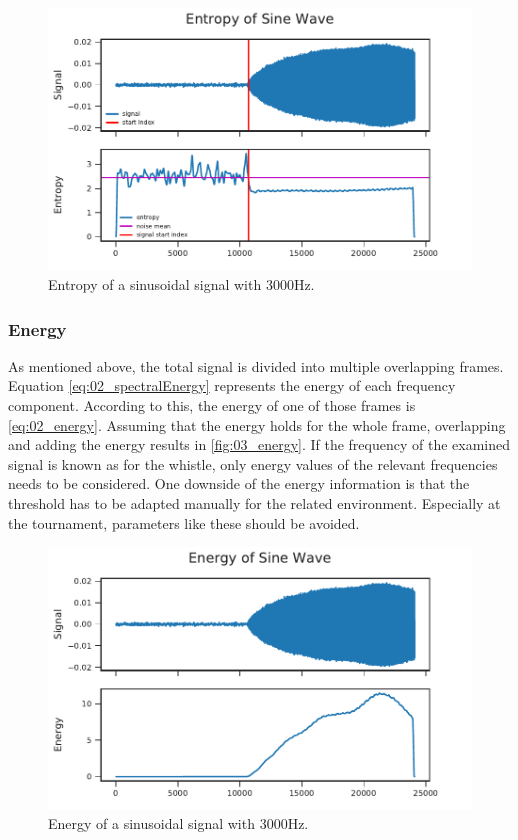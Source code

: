 \begin{figure}[ht]
	\centering
		\includegraphics[]{figures/sine_entropy}
	\caption{Entropy of a sinusoidal signal with 3000Hz.}
\end{figure}
\label{fig:03_entropy}

\subsubsection*{Energy}

As mentioned above, the total signal is divided into multiple overlapping frames.
Equation \cref{eq:02_spectralEnergy} represents the energy of each frequency
component.
According to this, the energy of one of those frames is \cref{eq:02_energy}.
Assuming that the energy holds for the whole frame, overlapping and adding the energy
results in \cref{fig:03_energy}.
If the frequency of the examined signal is known as for the whistle, only energy values
of the relevant frequencies needs to be considered.
One downside of the energy information is that the threshold has to be adapted
manually for the related environment.
Especially at the tournament, parameters like these should be avoided.

\begin{figure}[ht]
	\centering
		\includegraphics[]{figures/sine_energy}
	\caption{Energy of a sinusoidal signal with 3000Hz.}
\end{figure}
\label{fig:03_energy}

